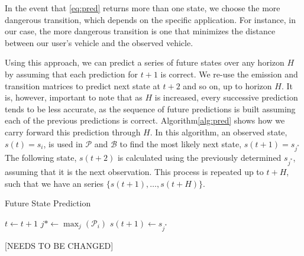 \documentclass[letterpaper, 10 pt, conference]{ieeeconf}  %
\newcommand\NB[1]{$\spadesuit$\footnote{NB: #1}}
\begin{document}
In the event that \eqref{eq:pred} returns more than one state, we choose the more dangerous transition, which depends on the specific application. For instance, in our case, the more dangerous transition is one that minimizes the distance between our user's vehicle and the observed vehicle.

Using this approach, we can predict a series of future states over any horizon $H$ by assuming that each prediction for $t+1$ is correct. We re-use the emission and transition matrices to predict next state at $t+2$ and so on, up to horizon $H$. It is, however, important to note that as $H$ is increased, every successive prediction tends to be less accurate, as the sequence of future predictions is built assuming each of the previous predictions is correct.
Algorithm\ref{alg:pred} shows how we carry forward this prediction through $H$.%
In this algorithm, an observed state, $s(t) = s_i$, is used in %
$\mathcal P$ and $\mathcal B$ to find the most likely next state, $s(t+1) = s_{j^*}$ %
The following state, $s(t+2)$ is calculated using the previously determined $s_{j^*}$, assuming that it is the next observation. This process is repeated up to $t+H$, such that we have an series $\{s(t+1),\ldots,s(t+H)\}$.

\begin{algorithm}[ht!]
\caption{Future State Prediction} \label{alg:pred}
\begin{algorithmic}[1]
\STATE $t \gets t+1$
\STATE $j* \gets \max_j(\mathcal{P}_{i})$
\ENDFOR
\STATE $s(t+1) \gets s_{j^*}$
\ENDWHILE
\end{algorithmic}
\end{algorithm}
[NEEDS TO BE CHANGED]
\end{document}
